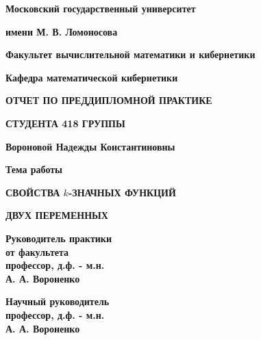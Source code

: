 \documentclass[oneside,final,14pt]{extreport}
\begin{document}

\centerline{ {\bf Московский государственный университет} }
\centerline{{\bf имени М. В. Ломоносова} }

\vspace{\baselineskip}

\centerline{ {\bf Факультет вычислительной математики и кибернетики} }
\centerline{{\bf Кафедра математической кибернетики} }

\vfill
\vfill

\centerline {{\bf ОТЧЕТ ПО ПРЕДДИПЛОМНОЙ ПРАКТИКЕ}}
\centerline {{\bf СТУДЕНТА 418 ГРУППЫ}}

\centerline {{\bf Вороновой Надежды Константиновны}}

\vfill
\vfill

\centerline {{\bf Тема работы}}

\centerline {{\bf СВОЙСТВА \(k\)-ЗНАЧНЫХ ФУНКЦИЙ}}
\centerline {{\bf ДВУХ ПЕРЕМЕННЫХ}}
\normalsize

\vfill
\vfill

\begin{minipage}{0.45\textwidth}
  {\bf Руководитель практики} \\
  {\bf от факультета} \\
  {\bf профессор, д.ф. - м.н.} \\
  {\bf А. А. Вороненко}
\end{minipage}
\hfill
\begin{minipage}{0.4\textwidth}
 {\bf Научный руководитель} \\
 {\bf профессор, д.ф. - м.н.}\\
{\bf А. А. Вороненко }
\end{minipage}


\begin{minipage}{0.45\textwidth}
\hfill             \\
{\bf \underline{ }\underline{ }\underline{ }\underline{ }\underline{ }\underline{ }\underline{ }\underline{ }\underline{ }\underline{ }\underline{ }\underline{ }\underline{ }\underline{ }\underline{ }\underline{ }\underline{ }\underline{ }\underline{ }\underline{ }\underline{ }\underline{ }}
\end{minipage}
\end{document}
